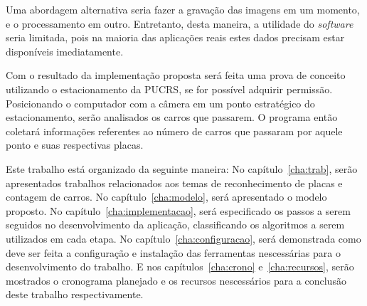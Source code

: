 Uma abordagem alternativa seria fazer a gravação das imagens em um momento, e o
processamento em outro. Entretanto, desta maneira, a utilidade do
\emph{software} seria limitada, pois na maioria das aplicações reais estes dados
precisam estar disponíveis imediatamente.

Com o resultado da implementação proposta será feita uma prova de conceito
utilizando o estacionamento da PUCRS, se for possível adquirir permissão.
Posicionando o computador com a câmera em um ponto estratégico do
estacionamento, serão analisados os carros que passarem. O programa então
coletará informações referentes ao número de carros que passaram por aquele ponto
e suas respectivas placas.

Este trabalho está organizado da seguinte maneira: No capítulo~\ref{cha:trab},
serão apresentados trabalhos relacionados aos temas de reconhecimento de placas
e contagem de carros. No capítulo~\ref{cha:modelo}, será apresentado o modelo
proposto. No capítulo~\ref{cha:implementacao}, será especificado os passos a serem
seguidos no desenvolvimento da aplicação, classificando os algoritmos a serem utilizados
em cada etapa. No capítulo~\ref{cha:configuracao}, será demonstrada como deve ser feita
a configuração e instalação das ferramentas nescessárias para o desenvolvimento do trabalho.
 E nos capítulos~\ref{cha:crono}  e~\ref{cha:recursos}, serão mostrados
o cronograma planejado e os recursos nescessários para a conclusão deste
trabalho respectivamente.
